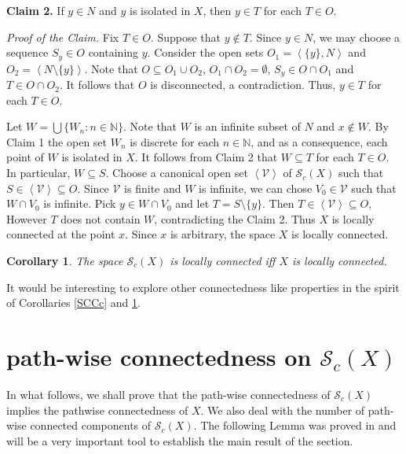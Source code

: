 \documentclass[11pt]{amsart}
\numberwithin{equation}{section}
\theoremstyle{plain}
\newtheorem{corollary}[equation]{Corollary}
\theoremstyle{definition}
\theoremstyle{definition}
\theoremstyle{definition}
\theoremstyle{definition}
\theoremstyle{definition}
\begin{document}
\textbf{Claim 2.} If $y \in N$ and $y$ is isolated in $X$, then $y \in T$ for each $T \in O$.\medskip

\textit{Proof of the Claim.} Fix $T \in O$. Suppose that $y \not \in T$. Since $y \in N$, we may choose a sequence $S_y \in O$ containing $y$. Consider the open sets $O_1 = \left\langle \{y\},N\right\rangle$ and $O_2 = \left\langle N \setminus \{y\}\right\rangle$. Note that $O \subseteq O_1 \cup O_2$, $O_1 \cap O_2 = \emptyset$, $S_y \in O \cap O_1$ and $T \in O \cap O_2$. It follows that $O$ is disconnected, a contradiction. Thus, $y \in T$ for each $T \in O$.\medskip

Let $W = \bigcup\{W_n : n \in {\mathbb N}\}$. Note that $W$ is an infinite subset of $N$ and $x \not \in W$. By Claim 1 the open set $W_n$ is discrete for each $n \in {\mathbb N}$, and as a consequence, each point of $W$ is isolated in $X$. It follows from Claim 2 that $W \subseteq T$ for each $T \in O$. In particular, $W \subseteq S$. Choose a canonical open set $\left\langle \mathcal{V}\right\rangle$ of $\mathcal{S}_c(X)$ such that $S \in \left\langle \mathcal{V}\right\rangle \subseteq O$. Since $\mathcal{V}$ is finite and $W$ is infinite, we can chose $V_0 \in \mathcal{V}$ such that $W \cap V_0$ is infinite. Pick $y \in W \cap V_0$ and let $T = S \setminus\{y\}$. Then $T \in \left\langle \mathcal{V}\right\rangle \subseteq O$, However $T$ does not contain $W$, contradicting the Claim 2. Thus $X$ is locally connected at the point $x$. Since $x$ is arbitrary, the space $X$ is locally connected.
\endproof

\begin{corollary}\label{SCLC}
The space $\mathcal{S}_c(X)$ is locally connected iff $X$ is locally connected.
\end{corollary}

It would be interesting to explore other connectedness like properties in the spirit of Corollaries \ref{SCCc} and \ref{SCLC}.

\section{path-wise connectedness on $\mathcal{S}_c(X)$}

In what follows, we shall prove that the path-wise connectedness of $\mathcal{S}_c(X)$ implies the pathwise connectedness of $X$.
We also deal with the number of path-wise connected components of $\mathcal{S}_c(X)$.
The following Lemma was proved in \cite{may-pat-rob} and will be a very important tool to establish the main result of the section.
\end{document}
